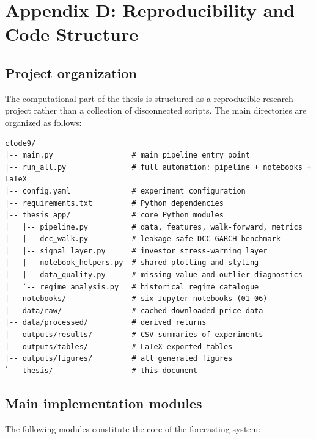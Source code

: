 \section{Appendix D: Reproducibility and Code Structure}

\subsection{Project organization}

The computational part of the thesis is structured as a reproducible research project rather than a collection of disconnected scripts. The main directories are organized as follows:

\begin{lstlisting}[language={}, caption={Top-level project directory structure.}, label=lst:dirstructure]
clode9/
|-- main.py                  # main pipeline entry point
|-- run_all.py               # full automation: pipeline + notebooks + LaTeX
|-- config.yaml              # experiment configuration
|-- requirements.txt         # Python dependencies
|-- thesis_app/              # core Python modules
|   |-- pipeline.py          # data, features, walk-forward, metrics
|   |-- dcc_walk.py          # leakage-safe DCC-GARCH benchmark
|   |-- signal_layer.py      # investor stress-warning layer
|   |-- notebook_helpers.py  # shared plotting and styling
|   |-- data_quality.py      # missing-value and outlier diagnostics
|   `-- regime_analysis.py   # historical regime catalogue
|-- notebooks/               # six Jupyter notebooks (01-06)
|-- data/raw/                # cached downloaded price data
|-- data/processed/          # derived returns
|-- outputs/results/         # CSV summaries of experiments
|-- outputs/tables/          # LaTeX-exported tables
|-- outputs/figures/         # all generated figures
`-- thesis/                  # this document
\end{lstlisting}

\subsection{Main implementation modules}

The following modules constitute the core of the forecasting system:

